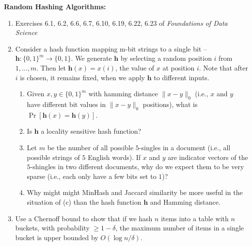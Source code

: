 \documentclass[11pt]{article}
\newcommand{\bv}[1]{\mathbf{#1}}
\newcommand{\norm}[1]{\|#1\|}
\begin{document}
\noindent\textbf{Random Hashing  Algorithms:}
\begin{enumerate}
\item Exercises 6.1, 6.2, 6.6,  6.7, 6.10, 6.19, 6.22, 6.23 of \emph{Foundations of Data Science}
\item Consider a hash function mapping m-bit strings to a single bit -- $\bv{h}: \{0,1\}^m\rightarrow \{0,1\}$. We generate $\bv{h}$ by selecting a random position $i$ from $1,\ldots, m$. Then let $\bv{h}(x) = x(i)$, the value of $x$ at  position $i$. Note that after $i$ is chosen, it remains fixed, when we apply $\bv{h}$ to different inputs.
\begin{enumerate}
\item Given $x,y \in \{0,1\}^m$ with hamming distance $\norm{x-y}_0$ (i.e., $x$ and $y$ have different bit values in $\norm{x-y}_0$ positions), what is $\Pr[\bv{h}(x) = \bv{h}(y)]$.
\item Is $\bv{h}$ a locality sensitive hash function?
\item Let $m$ be the number of all possible $5$-singles in a document (i.e., all possible strings of $5$ English words). If $x$ and $y$ are indicator vectors of the $5$-shingles in two different documents, why do we expect them to be very sparse (i.e., each only have a few bits set to $1$)?
\item Why might might MinHash and Jaccard similarity be more useful in the situation of (c) than the hash function $\bv{h}$ and Hamming distance.
\end{enumerate}
\item Use a Chernoff bound to show that if we hash $n$ items into a table with $n$ buckets, with probability $\ge 1-\delta$, the maximum number of items in a single bucket is upper bounded by $O(\log n/\delta)$.
\end{enumerate}

\end{document}
